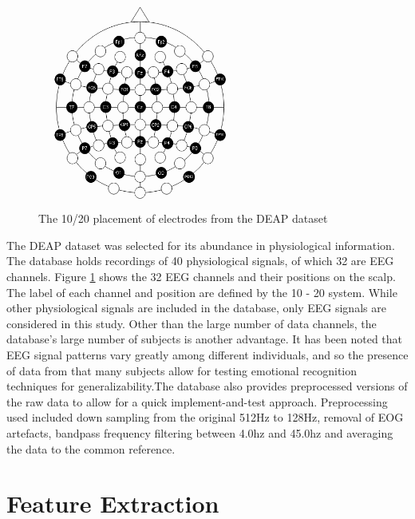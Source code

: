 \documentclass[12pt, a4paper, fleqn]{memoir}%
\begin{document}
\begin{figure}[h]
	\centering
	\includegraphics[width=0.6\textwidth]{pic.png}
	\caption{The 10/20 placement of electrodes from the DEAP dataset}
	\label{fig:eeg}
\end{figure}

The DEAP dataset was selected for its abundance in physiological information. The database holds recordings of 40 physiological signals, of which 32 are EEG channels. Figure \ref{fig:eeg} shows the 32 EEG channels and their positions on the scalp. The label of each channel and position are defined by the 10 - 20 system. While other physiological signals are included in the database, only EEG signals are considered in this study. Other than the large number of  data channels, the database's large number of subjects is another advantage. It has been noted that EEG signal patterns vary greatly among different individuals, and so the presence of data from that many subjects allow for testing emotional recognition techniques for generalizability.The database also provides preprocessed versions of the raw data to allow for a quick implement-and-test approach. Preprocessing used included down sampling from the original 512Hz to 128Hz, removal of EOG artefacts, bandpass frequency filtering between 4.0hz and 45.0hz and averaging the data to the common reference.

\chapter{Feature Extraction}
\label{chap:FeatureExtraction}
\end{document}
